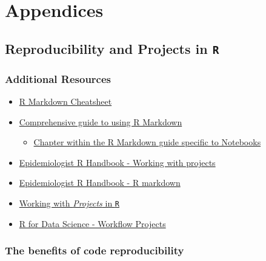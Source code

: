 \documentclass[
]{book}
\providecommand{\tightlist}{%
  \setlength{\itemsep}{0pt}\setlength{\parskip}{0pt}}
\begin{document}
\hypertarget{part-appendices}{%
\part{Appendices}\label{part-appendices}}

\hypertarget{reproducibility-and-projects-in-r}{%
\chapter{\texorpdfstring{Reproducibility and Projects in \texttt{R}}{Reproducibility and Projects in R}}\label{reproducibility-and-projects-in-r}}

\hypertarget{additional-resources-9}{%
\section*{Additional Resources}\label{additional-resources-9}}

\begin{itemize}
\tightlist
\item
  \href{https://github.com/rstudio/cheatsheets/raw/master/rmarkdown.pdf}{R Markdown Cheatsheet}
\item
  \href{https://bookdown.org/yihui/rmarkdown/}{Comprehensive guide to using R Markdown}

  \begin{itemize}
  \tightlist
  \item
    \href{https://bookdown.org/yihui/rmarkdown/notebook.html}{Chapter within the R Markdown guide specific to Notebooks}
  \end{itemize}
\item
  \href{https://epirhandbook.com/r-projects.html}{Epidemiologist R Handbook - Working with projects}
\item
  \href{https://epirhandbook.com/reports-with-r-markdown.html\#r-markdown-components}{Epidemiologist R Handbook - R markdown}
\item
  \href{https://support.rstudio.com/hc/en-us/articles/200526207-Using-Projects}{Working with \emph{Projects} in \texttt{R}}
\item
  \href{https://r4ds.had.co.nz/workflow-projects.html}{R for Data Science - Workflow Projects}
\end{itemize}

\hypertarget{the-benefits-of-code-reproducibility}{%
\section{The benefits of code reproducibility}\label{the-benefits-of-code-reproducibility}}
\end{document}
